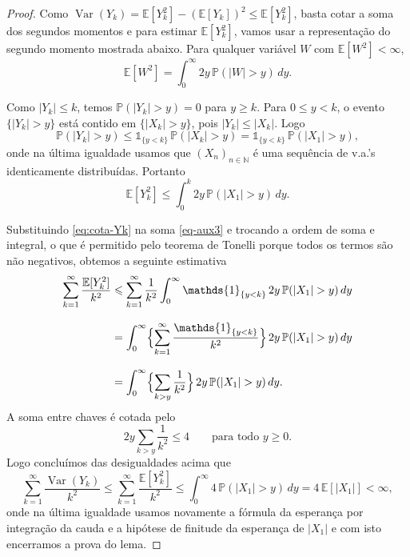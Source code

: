 \documentclass[12pt,portuguese]{article}
\theoremstyle{definition}
\theoremstyle{plainexercise}
\theoremstyle{starredexercise}
\theoremstyle{definition}
\begin{document}
\begin{proof}
Como $\operatorname{Var}(Y_k)=\mathbb{E}[Y_k^2]-(\mathbb{E}[Y_k])^2\leqslant
\mathbb{E}[Y_k^2]$, basta cotar a soma dos segundos momentos e
para estimar $\mathbb{E}[Y_k^2]$, vamos usar a representação do segundo momento mostrada abaixo. Para
qualquer variável $W$ com $\mathbb{E}[W^2]<\infty$,
\begin{equation}\label{eq:camadas}
\mathbb{E}[W^2]
=
\int_0^{\infty}2y\,\mathbb{P}(|W|>y)\,dy.
\end{equation}

Como $|Y_k|\leqslant k$, temos
$\mathbb{P}(|Y_k|>y)=0$ para $y\geqslant k$. Para $0\leqslant y<k$, o evento
$\{|Y_k|>y\}$ está contido em $\{|X_k|>y\}$, pois $|Y_k|\leqslant|X_k|$. Logo
\[
\mathbb{P}(|Y_k|>y)\leqslant\mathds{1}_{\{y<k\}}\,\mathbb{P}(|X_k|>y)
=
\mathds{1}_{\{y<k\}}\,\mathbb{P}(|X_1|>y),
\]
onde na última igualdade usamos que $(X_n)_{n\in\mathbb{N}}$ é uma sequência de v.a.'s identicamente distribuídas.
Portanto
\begin{equation}\label{eq:cota-Yk}
\mathbb{E}[Y_k^2]
\leqslant
\int_0^{k}2y\,\mathbb{P}(|X_1|>y)\,dy.
\end{equation}

Substituindo \eqref{eq:cota-Yk} na soma \eqref{eq-aux3} e trocando a ordem de soma e integral,
o que é permitido pelo teorema de Tonelli porque todos os termos são não
negativos, obtemos a seguinte estimativa
\begin{align*}
\sum_{k=1}^{\infty}\frac{\mathbb{E}[Y_k^2]}{k^2}
&\leqslant
\sum_{k=1}^{\infty}\frac{1}{k^2}\int_0^{\infty}
\mathds{1}_{\{y<k\}}\,2y\,\mathbb{P}(|X_1|>y)\,dy
\\[0.3cm]
&=
\int_0^{\infty}
\Bigl\{\sum_{k=1}^{\infty}\frac{\mathds{1}_{\{y<k\}}}{k^2}\Bigr\}
\,2y\,\mathbb{P}(|X_1|>y)\,dy
\\[0.3cm]
&=
\int_0^{\infty}
\Bigl\{\sum_{k>y}\frac{1}{k^2}\Bigr\}
\,2y\,\mathbb{P}(|X_1|>y)\,dy.
\end{align*}
A soma entre chaves é cotada pelo 
\[
2y\sum_{k>y}\frac{1}{k^2}\leqslant4
\qquad\text{para todo }y\geqslant0.
\]
Logo concluímos das desigualdades acima que
\[
\sum_{k=1}^{\infty}\frac{\operatorname{Var}(Y_k)}{k^2}
\leqslant
\sum_{k=1}^{\infty}\frac{\mathbb{E}[Y_k^2]}{k^2}
\leqslant
\int_0^{\infty}4\,\mathbb{P}(|X_1|>y)\,dy
=
4\,\mathbb{E}[|X_1|]
<
\infty,
\]
onde na última igualdade usamos novamente a fórmula da esperança por integração da cauda
e a hipótese de finitude da esperança de $|X_1|$ e com isto encerramos a prova do lema.
\end{proof}
\end{document}
